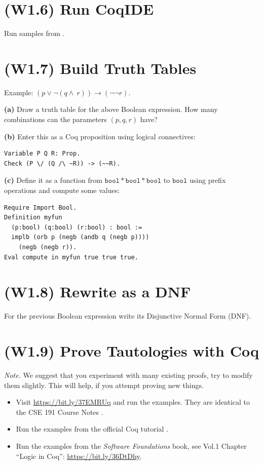 \documentclass[jou]{apa6}
\begin{document}
\section{(W1.6) Run CoqIDE}

Run samples from \textcite[][p.2--8]{Bertot2010}. 


\section{(W1.7) Build Truth Tables}

Example: $(p \vee \neg(q \wedge ~r)) \rightarrow (\neg \neg r).$

{\bf (a)} Draw a truth table for the above Boolean expression. 
How many combinations can the parameters
$(p,q,r)$ have?

{\bf (b)} Enter this as a Coq proposition using logical 
connectives:
\begin{verbatim}
Variable P Q R: Prop.
Check (P \/ (Q /\ ~R)) -> (~~R).
\end{verbatim}

{\bf (c)} Define it as a function from $\mathtt{bool*bool*bool}$ 
to $\mathtt{bool}$ using prefix operations and compute 
some values:
\begin{verbatim}
Require Import Bool.
Definition myfun 
  (p:bool) (q:bool) (r:bool) : bool :=
  implb (orb p (negb (andb q (negb p)))) 
    (negb (negb r)).
Eval compute in myfun true true true.
\end{verbatim}




\section{(W1.8) Rewrite as a DNF}

For the previous Boolean expression write 
its Disjunctive Normal Form (DNF).


\section{(W1.9) Prove Tautologies with Coq}

{\em Note.} We suggest that you experiment with 
many existing proofs, try to modify them slightly. 
This will help, if you attempt proving new things.

\begin{itemize}
\item Visit \url{https://bit.ly/37EMRUq} and run 
the examples. They are identical to the CSE 191 Course Notes
\parencite[][p.12--21]{Knepley2019}.
\item Run the examples from the official Coq tutorial 
\parencite[see][]{Nahas2012}.
\item Run the examples from the {\em Software Foundations}
book, see Vol.1 Chapter ``Logic in Coq'': \url{https://bit.ly/36DtDhy}.
\end{itemize}
\end{document}
